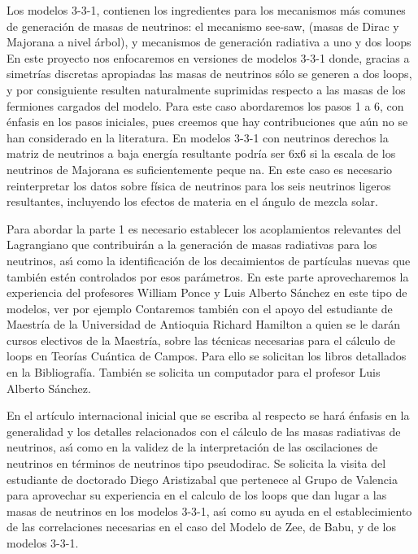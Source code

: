 \begin{ideas}
Los modelos 3-3-1, contienen los ingredientes para los mecanismos más
comunes de generación de masas de neutrinos: el mecanismo see-saw,
(masas de Dirac y Majorana a nivel árbol), y mecanismos de generación
radiativa a uno y dos loops %
En este proyecto nos enfocaremos en
versiones de modelos 3-3-1 donde, gracias a simetrías discretas
apropiadas %
las masas de neutrinos sólo se generen a dos loops, y
por consiguiente resulten naturalmente suprimidas respecto a las masas
de los fermiones cargados del modelo. Para este caso abordaremos los
pasos 1 a 6, con énfasis en los pasos iniciales, pues creemos que hay
contribuciones que aún no se han considerado en la literatura. En
modelos 3-3-1 con neutrinos derechos la matriz de neutrinos a baja
energía resultante podría ser 6x6 si la escala de los neutrinos de
Majorana es suficientemente peque na. En este caso es necesario
reinterpretar los datos sobre física de neutrinos para los seis
neutrinos ligeros resultantes, incluyendo los efectos de materia en el
ángulo de mezcla solar.

Para abordar la parte 1 es necesario establecer los acoplamientos
relevantes del Lagrangiano que contribuirán a la generación de masas
radiativas para los neutrinos, as\'\i{} como la identificación de los
decaimientos de partículas nuevas que también estén controlados por
esos parámetros. En este parte aprovecharemos la experiencia del
profesores William Ponce y Luis Alberto Sánchez en este tipo de
modelos, ver por ejemplo %
 Contaremos también con
el apoyo del estudiante de Maestría de la Universidad de Antioquia
Richard Hamilton a quien se le darán cursos electivos de la Maestría,
sobre las técnicas necesarias para el cálculo de loops en Teorías
Cuántica de Campos. Para ello se solicitan los libros detallados en la
Bibliografía. También se solicita un computador para el profesor Luis
Alberto Sánchez.

En el artículo internacional inicial que se escriba al respecto se
hará énfasis en la generalidad y los detalles relacionados con el
cálculo de las masas radiativas de neutrinos, as\'\i{} como en la validez
de la interpretación de las oscilaciones de neutrinos en términos de
neutrinos tipo pseudodirac. Se solicita la visita del estudiante de
doctorado Diego Aristizabal que pertenece al Grupo de Valencia para
aprovechar su experiencia en el calculo de los loops que dan lugar a
las masas de neutrinos en los modelos 3-3-1, as\'\i{} como su ayuda en el
establecimiento de las correlaciones necesarias en el caso del Modelo
de Zee, de Babu, y de los modelos 3-3-1.


\end{ideas}
